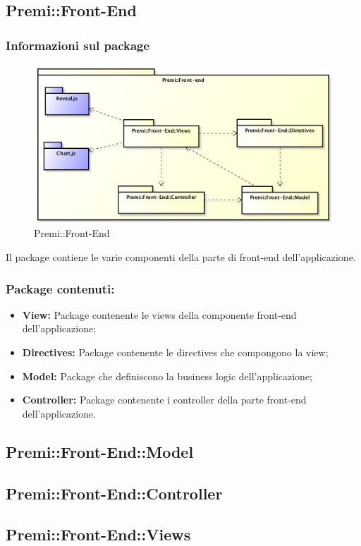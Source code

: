 \subsection{Premi::Front-End}
	\subsubsection*{Informazioni sul package}
		\begin{figure}[h]
			\centering
			\includegraphics[width=\linewidth]{img/front-end_package}
			\caption[Premi::Front-End]{Premi::Front-End}
		\end{figure}
		Il package contiene le varie componenti della parte di \gls{front-end} dell'applicazione.

		\subsubsection*{Package contenuti:}
			\begin{itemize}
				\item \textbf{View:} Package contenente le views della componente \gls{front-end} dell'applicazione;
				\item \textbf{Directives:} Package contenente le directives che compongono la view;
				\item \textbf{Model:} Package che definiscono la \gls{business} logic dell'applicazione;
				\item \textbf{Controller:} Package contenente i controller della parte \gls{front-end} dell'applicazione.
			\end{itemize}

		\subsection{Premi::Front-End::Model}
			

		\subsection{Premi::Front-End::Controller}
			
			\newpage

		\subsection{Premi::Front-End::Views}
			
			\newpage
